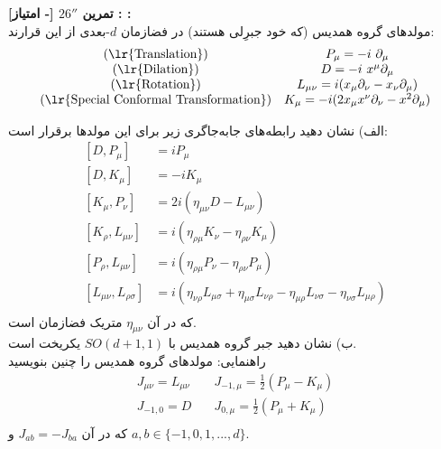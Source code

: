\documentclass{article}
\newenvironment{parind}{%
	\par%
	\leftskip=0mm\rightskip=7mm
	\noindent\ignorespaces}{%
	\par}
\newenvironment{exercise}[3][\unskip]{%
	\par
	\noindent
	\textbf{تمرین
		#1
		[- امتیاز] 
		\def\temp{#3}\ifx\temp\empty
		: 
		\else
		: #3 \vspace{0.5em} \\ \noindent
		\fi
}}{}
\begin{document}
	
	\begin{exercise}[$26''$]{20}{}
		مولدهای گروه همدیس 
		(که خود جبرِلی هستند)
		در فضازمان
		$d$-بعدی 
		از این قرارند:
		\begin{equation*}
			\begin{matrix}\left(\text{\lr{Translation}}\right)&P_\mu=-i\ \partial_\mu\\
				\left(\text{\lr{Dilation}}\right)&D=-i\ x^\mu\partial_\mu\\
				\left(\text{\lr{Rotation}}\right)&L_{\mu\nu}=i(x_\mu\partial_\nu-x_\nu\partial_\mu)\\
				\left(\text{\lr{Special Conformal Transformation}}\right) & K_\mu=-i({2x}_\mu x^\nu\partial_\nu-x^2\partial_\mu)\\\end{matrix}
		\end{equation*}
		\noindent
		\begin{parind}
		الف)‌ نشان دهید رابطه‌های جابه‌جاگری زیر برای این مولدها برقرار است: 
		\begin{equation*}
			\begin{aligned}
				[D,P_{\mu}]&=i P_{\mu}\\
				[D,K_{\mu}]&=-i K_{\mu}\\
				[K_{\mu},P_{\nu}]&=2i(\eta _{\mu \nu} D - L_{\mu \nu})\\
				[K_{\rho},L_{\mu \nu}]&=i(\eta _{\rho \mu} K_{\nu} - \eta _{\rho \nu} K_{\mu})\\
				[P_{\rho},L_{\mu \nu}]&=i(\eta _{\rho \mu} P_{\nu} - \eta _{\rho \nu} P_{\mu})\\
				[L_{\mu \nu},L_{\rho \sigma}]&=i(\eta _{\nu \rho} L_{\mu \sigma} + \eta _{\mu \sigma} L_{\nu \rho} - \eta _{\mu \rho} L_{\nu \sigma} - \eta _{\nu \sigma} L_{\mu \rho})\\
			\end{aligned}
		\end{equation*}
		که در آن 
		$\eta _{\mu \nu}$ 
		متریک فضازمان است. \\
		ب) نشان دهید جبر گروه همدیس با 
		$SO(d+1,1)$ 
		یکریخت است.
		\\
		\indent
		راهنمایی: مولدهای گروه همدیس را چنین بنویسید 
		\begin{equation*}
			\begin{matrix}
				J_{\mu \nu}=L_{\mu \nu} &\quad J_{-1,\mu}=\frac{1}{2}(P_{\mu}-K_{\mu})\\
				J_{-1,0}=D &\quad J_{0,\mu}=\frac{1}{2}(P_{\mu}+K_{\mu})\\
			\end{matrix}
		\end{equation*}
		\indent
		که در آن 
		$J_{ab}=-J_{ba}$ 
		و 
		$a,b \in \{-1,0,1,...,d\}$. 
				\end{parind}
	\end{exercise}
	
\end{document}
